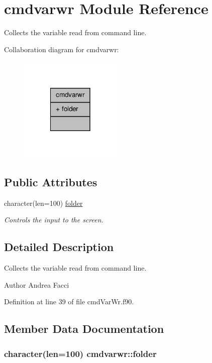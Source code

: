 \hypertarget{classcmdvarwr}{\section{cmdvarwr Module Reference}
\label{classcmdvarwr}
}


Collects the variable read from command line.  




Collaboration diagram for cmdvarwr\-:\nopagebreak
\begin{figure}[H]
\begin{center}
\leavevmode
\includegraphics[width=138pt]{classcmdvarwr__coll__graph}
\end{center}
\end{figure}
\subsection*{Public Attributes}
\begin{DoxyCompactItemize}
\item 
character(len=100) \hyperlink{classcmdvarwr_ab83d531fba70cd2cf7e8852c2818ce34}{folder}
\begin{DoxyCompactList}\small\item\em Controls the input to the screen. \end{DoxyCompactList}\end{DoxyCompactItemize}


\subsection{Detailed Description}
Collects the variable read from command line. \begin{DoxyAuthor}{Author}
Andrea Facci 
\end{DoxyAuthor}


Definition at line 39 of file cmd\-Var\-Wr.\-f90.



\subsection{Member Data Documentation}
\hypertarget{classcmdvarwr_ab83d531fba70cd2cf7e8852c2818ce34}{
\subsubsection[{folder}]{\setlength{\rightskip}{0pt plus 5cm}character(len=100) cmdvarwr\-::folder}}\label{classcmdvarwr_ab83d531fba70cd2cf7e8852c2818ce34}


